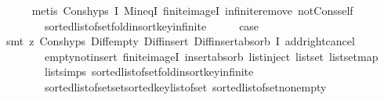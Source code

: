 \begin{isabellebody}
\ \ \ \ \isamarkupfalse%
\ {\isacharparenleft}{\kern0pt}metis\ Cons{\isachardot}{\kern0pt}hyps{\isacharparenleft}{\kern0pt}{}{\isacharparenright}{\kern0pt}\ I{}\ Min{\isacharunderscore}{\kern0pt}eqI\ finite{\isacharunderscore}{\kern0pt}imageI\ infinite{\isacharunderscore}{\kern0pt}remove\ not{\isacharunderscore}{\kern0pt}Cons{\isacharunderscore}{\kern0pt}self\isanewline
\ \ \ \ \ \ \ \ sorted{\isacharunderscore}{\kern0pt}list{\isacharunderscore}{\kern0pt}of{\isacharunderscore}{\kern0pt}set{\isachardot}{\kern0pt}fold{\isacharunderscore}{\kern0pt}insort{\isacharunderscore}{\kern0pt}key{\isachardot}{\kern0pt}infinite{\isacharparenright}{\kern0pt}\isanewline
\ \ \isamarkupfalse%
\ \isamarkupfalse%
\ {\isacharquery}{\kern0pt}case\isanewline
\ \ \ \ \isamarkupfalse%
\ {\isacharparenleft}{\kern0pt}smt\ {\isacharparenleft}{\kern0pt}z{}{\isacharparenright}{\kern0pt}\ Cons{\isachardot}{\kern0pt}hyps{\isacharparenleft}{\kern0pt}{}{\isacharparenright}{\kern0pt}\ Diff{\isacharunderscore}{\kern0pt}empty\ Diff{\isacharunderscore}{\kern0pt}insert{}\ Diff{\isacharunderscore}{\kern0pt}insert{\isacharunderscore}{\kern0pt}absorb\ I{}\ add{\isacharunderscore}{\kern0pt}right{\isacharunderscore}{\kern0pt}cancel\isanewline
\ \ \ \ \ \ \ \ empty{\isacharunderscore}{\kern0pt}not{\isacharunderscore}{\kern0pt}insert\ finite{\isacharunderscore}{\kern0pt}imageI\ insert{\isacharunderscore}{\kern0pt}absorb\ list{\isachardot}{\kern0pt}inject\ list{\isachardot}{\kern0pt}set{\isacharparenleft}{\kern0pt}{}{\isacharcomma}{\kern0pt}{}{\isacharparenright}{\kern0pt}\ list{\isachardot}{\kern0pt}set{\isacharunderscore}{\kern0pt}map\isanewline
\ \ \ \ \ \ \ \ list{\isachardot}{\kern0pt}simps{\isacharparenleft}{\kern0pt}{}{\isacharcomma}{\kern0pt}{}{\isacharparenright}{\kern0pt}\ sorted{\isacharunderscore}{\kern0pt}list{\isacharunderscore}{\kern0pt}of{\isacharunderscore}{\kern0pt}set{\isachardot}{\kern0pt}fold{\isacharunderscore}{\kern0pt}insort{\isacharunderscore}{\kern0pt}key{\isachardot}{\kern0pt}infinite\isanewline
\ \ \ \ \ \ \ \ sorted{\isacharunderscore}{\kern0pt}list{\isacharunderscore}{\kern0pt}of{\isacharunderscore}{\kern0pt}set{\isachardot}{\kern0pt}set{\isacharunderscore}{\kern0pt}sorted{\isacharunderscore}{\kern0pt}key{\isacharunderscore}{\kern0pt}list{\isacharunderscore}{\kern0pt}of{\isacharunderscore}{\kern0pt}set\ sorted{\isacharunderscore}{\kern0pt}list{\isacharunderscore}{\kern0pt}of{\isacharunderscore}{\kern0pt}set{\isacharunderscore}{\kern0pt}nonempty{\isacharparenright}{\kern0pt}\isanewline

\end{isabellebody}
